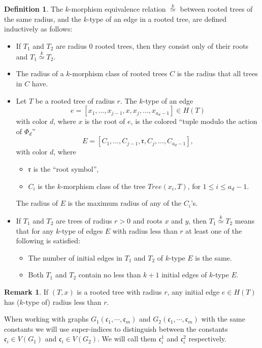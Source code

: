 \documentclass[11pt,notitlepage,a4paper]{article}
\theoremstyle{definition}
\newtheorem{definition}{Definition}[section]
\newtheorem{remark}{Remark}[section]
\newcommand{\cc}{\mathfrak{c}}
\newcommand{\clist}{\mathfrak{c}_{1}, \cdots, \mathfrak{c}_m}
\newcommand{\morph}[1]{\stackrel{#1}{\simeq}}
\begin{document}
\begin{definition} 
	The $k$-morphism equivalence relation $\morph{k}$ between rooted trees
	of the same radius,
	and the $k$-type of an edge in a rooted tree,
	are defined inductively as follows:
	
	\begin{itemize}
		\item If $T_1$ and $T_2$ are radius $0$ rooted trees, then they consist only of their roots and $T_1\morph{k} T_2$. 
		\item The radius of a $k$-morphism class of rooted trees $C$
		is the radius that all trees in $C$ have.
		\item Let $T$ be a rooted tree of radius $r$. The $k$-type
		of an edge 
		\[e=[x_1,\dots, x_{j-1}, x ,x_j, \dots, x_{a_d-1}]\in H(T)\]
		with color $d$, where $x$ is the root of $e$, is the colored 
		``tuple modulo the action of $\Phi_d$'' 
		\[E=[C_1,\dots, C_{j-1}, \mathfrak{r}, C_j,\dots, C_{a_d -1}]
		,\]
		with color $d$, where
		\begin{itemize}
			\item $\mathfrak{r}$ is the ``root symbol'',
			\item $C_i$ is the $k$-morphism class of the tree
			$Tree(x_i,T)$, for $1\leq i \leq a_d-1$.
		\end{itemize} 
		The radius of $E$ is the maximum radius of any of the
		$C_i$'s.  
		
		\item If $T_1$ and $T_2$ are trees of radius $r>0$ and roots $x$ and $y$, then $T_1\morph{k} T_2$ means that for any $k$-type of edges $E$
		with radius less than $r$ at least one of the following is satisfied:
		\begin{itemize}
			\item The number of initial edges in $T_1$ and $T_2$ of $k$-type $E$ 
			is the same.
			\item Both $T_1$ and $T_2$ contain no less than $k+1$
			initial edges of $k$-type $E$. 
		\end{itemize}
	\end{itemize}
\end{definition}

\begin{remark}
	If $(T,x)$ is a rooted tree with radius 
	$r$, any initial edge $e\in H(T)$ has ($k$-type
	of) radius less than $r$.
\end{remark}

When working with graphs $G_1(\clist)$ and $G_2(\clist)$ with the 
same constants we will use super-indices to distinguish between the
constants $\cc_i\in V(G_1)$ and $\cc_i \in V(G_2)$. We will call them
$\cc_i^1$ and $\cc_i^2$ respectively.   
\end{document}

